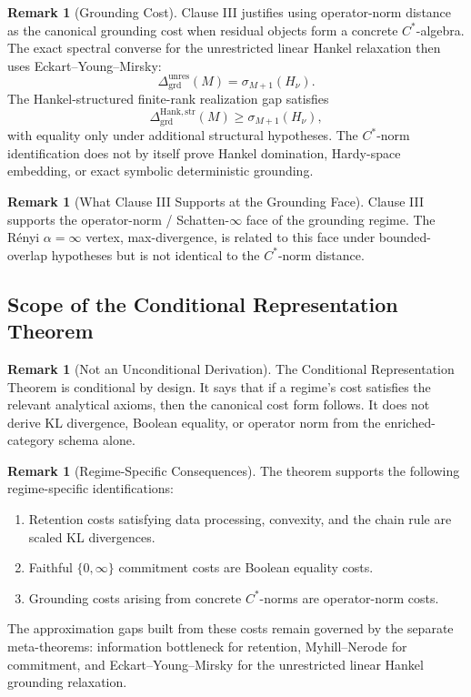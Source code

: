 \documentclass[12pt]{article}
\theoremstyle{definition}
\newtheorem{remark}[theorem]{Remark}
\newcommand{\Dunres}{\Delta_{\mathrm{grd}}^{\mathrm{unres}}}
\newcommand{\DHankstr}{\Delta_{\mathrm{grd}}^{\mathrm{Hank,str}}}
\begin{document}
\begin{remark}[Grounding Cost]
\label{rem:clauseIII-grounding}
Clause III justifies using operator-norm distance as the canonical grounding
cost when residual objects form a concrete $C^*$-algebra.  The exact spectral
converse for the unrestricted linear Hankel relaxation then uses
Eckart--Young--Mirsky:
\[
\Dunres(M)
=
\sigma_{M+1}(H_\nu).
\]
The Hankel-structured finite-rank realization gap satisfies
\[
\DHankstr(M)
\ge
\sigma_{M+1}(H_\nu),
\]
with equality only under additional structural hypotheses.  The $C^*$-norm
identification does not by itself prove Hankel domination, Hardy-space
embedding, or exact symbolic deterministic grounding.
\end{remark}

\begin{remark}[What Clause III Supports at the Grounding Face]
\label{rem:clauseIII-grounding-vertex}
Clause III supports the operator-norm / Schatten-$\infty$ face of the
grounding regime.  The R\'enyi $\alpha=\infty$ vertex, max-divergence, is
related to this face under bounded-overlap hypotheses but is not identical to
the $C^*$-norm distance.
\end{remark}

\subsection{Scope of the Conditional Representation Theorem}
\label{subsec:conditional-rep-scope}

\begin{remark}[Not an Unconditional Derivation]
\label{rem:conditional-not-unconditional}
The Conditional Representation Theorem is conditional by design.  It says that
if a regime's cost satisfies the relevant analytical axioms, then the canonical
cost form follows.  It does not derive KL divergence, Boolean equality, or
operator norm from the enriched-category schema alone.
\end{remark}

\begin{remark}[Regime-Specific Consequences]
\label{rem:conditional-consequences}
The theorem supports the following regime-specific identifications:
\begin{enumerate}[label=(\arabic*)]
\item Retention costs satisfying data processing, convexity, and the chain
rule are scaled KL divergences.
\item Faithful $\{0,\infty\}$ commitment costs are Boolean equality costs.
\item Grounding costs arising from concrete $C^*$-norms are operator-norm
costs.
\end{enumerate}
The approximation gaps built from these costs remain governed by the separate
meta-theorems: information bottleneck for retention, Myhill--Nerode for
commitment, and Eckart--Young--Mirsky for the unrestricted linear Hankel
grounding relaxation.
\end{remark}
\end{document}
